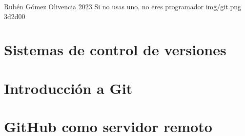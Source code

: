 \documentclass{\ClassPath/yukibook}
\begin{document}
    {Rubén Gómez Olivencia}  %
    {2023}    %
    {} %
    {Si no usas uno, no eres programador} %
    {} %
    {img/git.png} %
    {3d2d00}
    {} %

        \coverpage
        \graphicspath{{../../yukibook.cls/}}
        \licensepage
        \tableofcontents

    \graphicspath{{img/}}
    \part{Sistemas de control de versiones}
    
    \part{Introducción a Git}
    

    \part{GitHub como servidor remoto}
    


\end{document}
